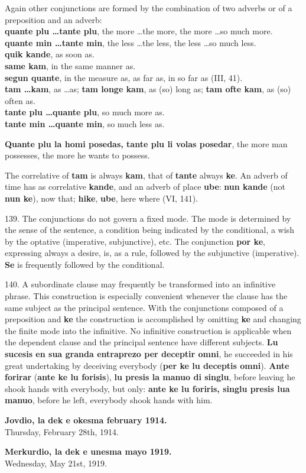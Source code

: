 Again other conjunctions are formed by the combination of two adverbs or of a preposition and an adverb: \\
\textbf{quante plu \ldots tante plu}, the more \ldots the more, the more \ldots so much more. \\
\textbf{quante min \ldots tante min}, the less \ldots the less, the less \ldots so much less. \\
\textbf{quik kande}, as soon as. \\
\textbf{same kam}, in the same manner as. \\
\textbf{segun quante}, in the measure as, as far as, in so far as (III, 41). \\
\textbf{tam \ldots kam}, as \ldots as; \textbf{tam longe kam}, as (so) long as; \textbf{tam ofte kam}, as (so) often as. \\
\textbf{tante plu \ldots quante plu}, so much more as. \\
\textbf{tante min \ldots quante min}, so much less as.

\textbf{Quante plu la homi posedas, tante plu li volas posedar}, the more man possesses, the more he wants to possess.

The correlative of \textbf{tam} is always \textbf{kam}, that of \textbf{tante} always \textbf{ke}. An adverb of time has as correlative \textbf{kande}, and an adverb of place \textbf{ube}: \textbf{nun kande} (not \textbf{nun ke}), now that; \textbf{hike}, \textbf{ube}, here where (VI, 141).

139. The conjunctions do not govern a fixed mode. The mode is determined by the sense of the sentence, a condition being indicated by the conditional, a wish by the optative (imperative, subjunctive), etc. The conjunction \textbf{por ke}, expressing always a desire, is, as a rule, followed by the subjunctive (imperative). \textbf{Se} is frequently followed by the conditional.

140. A subordinate clause may frequently be transformed into an infinitive phrase. This construction is especially convenient whenever the clause has the same subject as the principal sentence. With the conjunctions composed of a preposition and \textbf{ke} the construction is accomplished by omitting \textbf{ke} and changing the finite mode into the infinitive. No infinitive construction is applicable when the dependent clause and the principal sentence have different subjects. \textbf{Lu sucesis en sua granda entraprezo per deceptir omni}, he succeeded in his great undertaking by deceiving everybody (\textbf{per ke lu deceptis omni}). \textbf{Ante forirar }(\textbf{ante ke lu forisis}), \textbf{lu presis la manuo di singlu}, before leaving he shook hands with everybody, but only: \textbf{ante ke lu foriris, singlu presis lua manuo}, before he left, everybody shook hands with him.

\RaggedLeft
\textbf{Jovdio, la dek e okesma february 1914.} \\
Thursday, February 28th, 1914.

\textbf{Merkurdio, la dek e unesma mayo 1919.} \\
Wednesday, May 21st, 1919. \par \justifying
